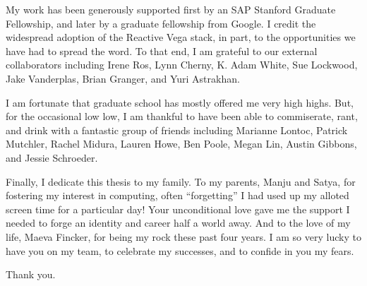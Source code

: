 My work has been generously supported first by an SAP Stanford Graduate
Fellowship, and later by a graduate fellowship from Google. I credit the
widespread adoption of the Reactive Vega stack, in part, to the opportunities we
have had to spread the word. To that end, I am grateful to our external
collaborators including Irene Ros, Lynn Cherny, K. Adam White, Sue Lockwood,
Jake Vanderplas, Brian Granger, and Yuri Astrakhan.

I am fortunate that graduate school has mostly offered me very high highs. But,
for the occasional low low, I am thankful to have been able to commiserate,
rant, and drink with a fantastic group of friends including Marianne Lontoc,
Patrick Mutchler, Rachel Midura, Lauren Howe, Ben Poole, Megan Lin, Austin
Gibbons, and Jessie Schroeder.

Finally, I dedicate this thesis to my family. To my parents, Manju and Satya,
for fostering my interest in computing, often ``forgetting'' I had used up my
alloted screen time for a particular day! Your unconditional love gave me the
support I needed to forge an identity and career half a world away. And to the
love of my life, Maeva Fincker, for being my rock these past four years. I am so
very lucky to have you on my team, to celebrate my successes, and to confide in
you my fears.

Thank you.